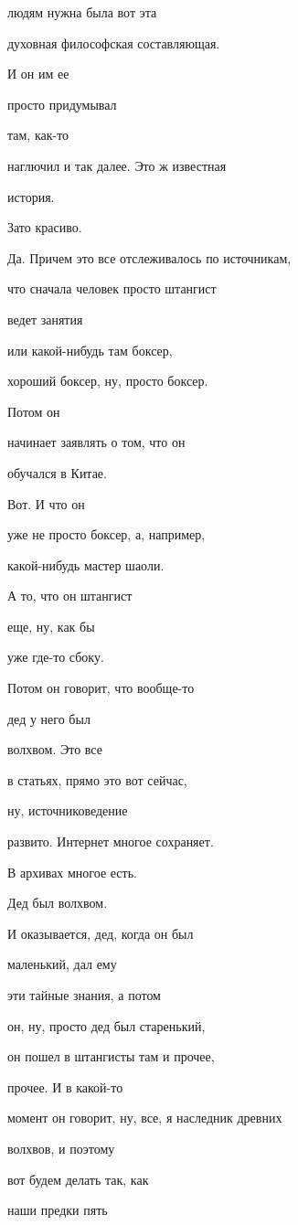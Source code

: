 людям нужна была вот эта

духовная философская составляющая.

И он им ее

просто придумывал

там, как-то

наглючил и так далее. Это ж известная

история.

Зато красиво.

Да. Причем это все отслеживалось по источникам,

что сначала человек просто штангист

ведет занятия

или какой-нибудь там боксер,

хороший боксер, ну, просто боксер.

Потом он

начинает заявлять о том, что он

обучался в Китае.

Вот. И что он

уже не просто боксер, а, например,

какой-нибудь мастер шаоли.

А то, что он штангист

еще, ну, как бы

уже где-то сбоку.

Потом он говорит, что вообще-то

дед у него был

волхвом. Это все

в статьях, прямо это вот сейчас,

ну, источниковедение

развито. Интернет многое сохраняет.

В архивах многое есть.

Дед был волхвом.

И оказывается, дед, когда он был

маленький, дал ему

эти тайные знания, а потом

он, ну, просто дед был старенький,

он пошел в штангисты там и прочее,

прочее. И в какой-то

момент он говорит, ну, все, я наследник древних

волхвов, и поэтому

вот будем делать так, как

наши предки пять

